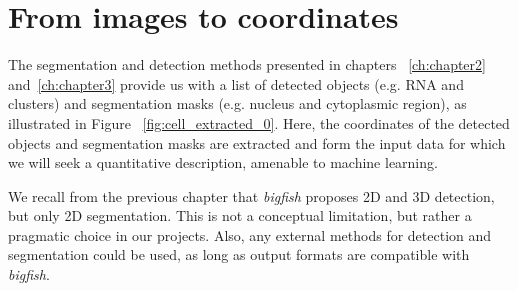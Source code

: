 \section{From images to coordinates}
\label{sec:image_coordinates}


The segmentation and detection methods presented in chapters ~\ref{ch:chapter2} and~\ref{ch:chapter3} provide us with a list of detected objects (e.g. \ac{RNA} and clusters) and segmentation masks (e.g. nucleus and cytoplasmic region), as illustrated in Figure ~\ref{fig:cell_extracted_0}. Here, the coordinates of the detected objects and segmentation masks are extracted and form the input data for which we will seek a quantitative description, amenable to machine learning. 

We recall from the previous chapter that \emph{bigfish} proposes 2D and 3D detection, but only 2D segmentation. This is not a conceptual limitation, but rather a pragmatic choice in our projects. 
Also, any external methods for detection and segmentation could be used, as long as output formats are compatible with \emph{bigfish}.


